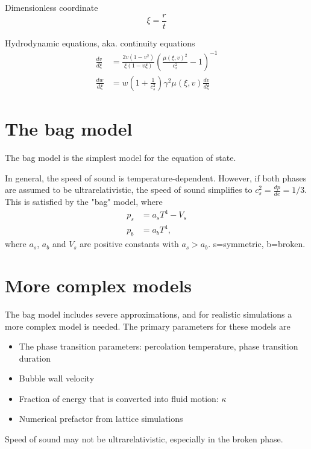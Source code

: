 Dimensionless coordinate
\begin{equation}
\xi = \frac{r}{t}
\end{equation}

Hydrodynamic equations, aka. continuity equations
\cites[eq. 7.30-7.31]{lecture_notes}[eq. 5]{giese_2021}
\begin{align}
\frac{dv}{d\xi} &= \frac{2v(1-v^2)}{\xi(1-v\xi)} \left( \frac{\mu(\xi,v)^2}{c_s^2} - 1 \right)^{-1} \\
\frac{dw}{d\xi} &= w \left( 1 + \frac{1}{c_s^2} \right) \gamma^2 \mu(\xi,v) \frac{dv}{d\xi}
\end{align}


\section{The bag model}
The bag model is the simplest model for the equation of state.

In general, the speed of sound is temperature-dependent.
However, if both phases are assumed to be ultrarelativistic, the speed of sound simplifies to $c_s^2 = \frac{dp}{de} = 1/3$.
This is satisfied by the "bag" model, where
\cites[eq. 7.33]{lecture_notes}[eq. 8-9]{giese_2020}
\begin{align}
p_s &= a_s T^4 - V_s
\label{eq:bag_ps} \\
p_b &= a_b T^4,
\label{eq:bag_pb}
\end{align}
where $a_s$, $a_b$ and $V_s$ are positive constants with $a_s > a_b$.
s=symmetric, b=broken.


\section{More complex models}
The bag model includes severe approximations, and for realistic simulations a more complex model is needed.
The primary parameters for these models are
\begin{itemize}
    \item The phase transition parameters: percolation temperature, phase transition duration
    \item Bubble wall velocity
    \item Fraction of energy that is converted into fluid motion: $\kappa$
    \item Numerical prefactor from lattice simulations
\end{itemize}

Speed of sound may not be ultrarelativistic, especially in the broken phase.

